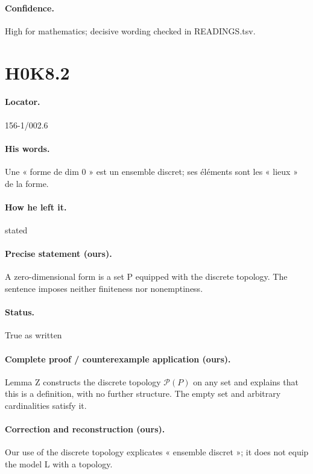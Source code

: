 \paragraph{Confidence.} High for mathematics; decisive wording checked in READINGS.tsv.

\section*{H0K8.2}\label{statement:H0K8.2}
\paragraph{Locator.} 156-1/002.6

\paragraph{His words.} Une « forme de dim 0 » est un ensemble discret; ses éléments sont les « lieux » de la forme.

\paragraph{How he left it.} stated

\paragraph{Precise statement (ours).} A zero-dimensional form is a set P equipped with the discrete topology. The sentence imposes neither finiteness nor nonemptiness.

\paragraph{Status.} True as written

\paragraph{Complete proof / counterexample application (ours).} Lemma Z constructs the discrete topology \(\mathcal P(P)\) on any set and explains that this is a definition, with no further structure. The empty set and arbitrary cardinalities satisfy it.

\paragraph{Correction and reconstruction (ours).} Our use of the discrete topology explicates « ensemble discret »; it does not equip the model L with a topology.


